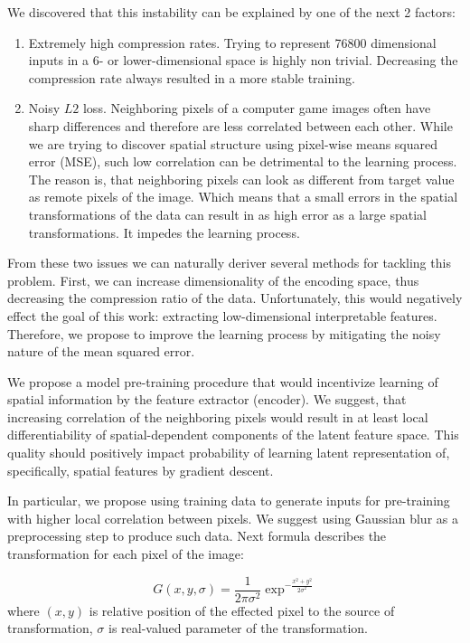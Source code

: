 We discovered that this instability can be explained by one of the next 2 factors:
\begin{enumerate}
  \item Extremely high compression rates. Trying to represent 76800 dimensional inputs in a 6- or lower-dimensional space is highly non trivial. Decreasing the compression rate always resulted in a more stable training.
  \item Noisy $L2$ loss. Neighboring pixels of a computer game images often have sharp differences and therefore are less correlated between each other.
  While we are trying to discover spatial structure using pixel-wise means squared error (MSE), such low correlation can be detrimental to the learning process.
  The reason is, that neighboring pixels can look as different from target value as remote pixels of the image.
  Which means that a small errors in the spatial transformations of the data can result in as high error as a large spatial transformations.
  It impedes the learning process.
\end{enumerate}

From these two issues we can naturally deriver several methods for tackling this problem.
First, we can increase dimensionality of the encoding space, thus decreasing the compression ratio of the data.
Unfortunately, this would negatively effect the goal of this work: extracting low-dimensional interpretable features.
Therefore, we propose to improve the learning process by mitigating the noisy nature of the mean squared error.

We propose a model pre-training procedure that would incentivize learning of spatial information by the feature extractor (encoder).
We suggest, that increasing correlation of the neighboring pixels would result in at least local differentiability of spatial-dependent components of the latent feature space.
This quality should positively impact probability of learning latent representation of, specifically, spatial features by gradient descent.

In particular, we propose using training data to generate inputs for pre-training with higher local correlation between pixels.
We suggest using Gaussian blur as a preprocessing step to produce such data.
Next formula describes the transformation for each pixel of the image:

\begin{equation}
  G(x, y, \sigma) = \frac{1}{2\pi\sigma^2}\exp^{-\frac{x^2+y^2}{2\sigma^2}}
\end{equation}
where $(x, y)$ is relative position of the effected pixel to the source of transformation, $\sigma$ is real-valued parameter of the transformation.

